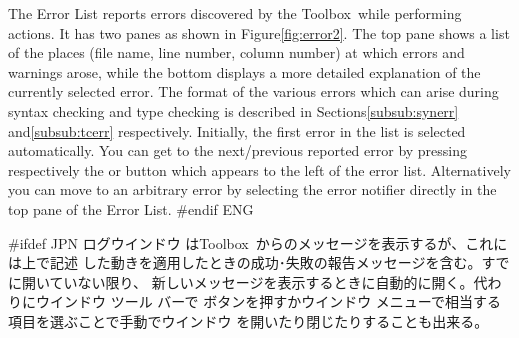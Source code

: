 \documentclass[\pformat,12pt]{article}
\newcommand{\Toolbox}{Toolbox}
\newcommand{\Toolbox}{Toolbox}
\newcommand{\guicmd}[1]{{\sf #1}}
\newcommand{\guicmd}[1]{{\gt #1}}
\begin{document}

The \guicmd{Error List} reports errors discovered by the \Toolbox\
while performing actions. It has two panes as shown in
Figure\ref{fig:error2}. The top pane shows a list of the places (file
name, line number, column number) at which errors and warnings arose,
while the bottom displays a more detailed explanation of the currently
selected error. The format of the various errors which can arise
  during syntax checking and type checking is described in
  Sections\ref{subsub:synerr} and\ref{subsub:tcerr} respectively.  
Initially, the first error in the list is selected
automatically. You can get to the next/previous reported error by
pressing respectively the {\fbox{\tt >}} or \fbox{{\tt <}} button
which appears to the left of the error list. Alternatively you can
move to an arbitrary error by selecting the error notifier directly in
the top pane of the \guicmd{Error List}.
#endif ENG

#ifdef JPN
\guicmd{ログウインドウ} は\Toolbox\ からのメッセージを表示するが、これには上で記述
した動きを適用したときの成功･失敗の報告メッセージを含む。すでに開いていない限り、
新しいメッセージを表示するときに自動的に開く。代わりに\guicmd{ウインドウ} ツール
バーで 
ボタンを押すか\guicmd{ウインドウ} メニューで相当する項目を選ぶことで手動でウインドウ
を開いたり閉じたりすることも出来る。

\end{document}
